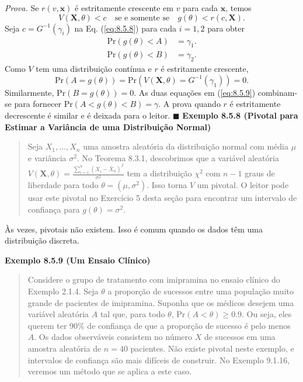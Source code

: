 \noindent\textit{Prova.} Se $r(v, \mathbf{x})$ é estritamente crescente em $v$ para cada $\mathbf{x}$, temos
\begin{equation} \label{eq:8.5.8}
V(\mathbf{X}, \theta) < c \quad \text{se e somente se} \quad g(\theta) < r(c, \mathbf{X}).
\end{equation}
Seja $c = G^{-1}(\gamma_i)$ na Eq. (\ref{eq:8.5.8}) para cada $i=1, 2$ para obter
\begin{align} 
    \text{Pr}(g(\theta) < A) &= \gamma_1. \nonumber \\
    \text{Pr}(g(\theta) < B) &= \gamma_2. \label{eq:8.5.9}
\end{align}
Como $V$ tem uma distribuição contínua e $r$ é estritamente crescente,
$$
\text{Pr}(A = g(\theta)) = \text{Pr}(V(\mathbf{X}, \theta) = G^{-1}(\gamma_1)) = 0.
$$
Similarmente, $\text{Pr}(B = g(\theta)) = 0$. As duas equações em (\ref{eq:8.5.9}) combinam-se para fornecer $\text{Pr}(A < g(\theta) < B) = \gamma$. A prova quando $r$ é estritamente decrescente é similar e é deixada para o leitor. \hfill $\blacksquare$
\vspace{1em}
\noindent\textbf{Exemplo 8.5.8 (Pivotal para Estimar a Variância de uma Distribuição Normal)}
\begin{quote}
    Seja $X_1, \dots, X_n$ uma amostra aleatória da distribuição normal com média $\mu$ e variância $\sigma^2$. No Teorema 8.3.1, descobrimos que a variável aleatória $V(\mathbf{X}, \theta) = \frac{\sum_{i=1}^n(X_i - \bar{X}_n)^2}{\sigma^2}$ tem a distribuição $\chi^2$ com $n-1$ graus de liberdade para todo $\theta = (\mu, \sigma^2)$. Isso torna $V$ um pivotal. O leitor pode usar este pivotal no Exercício 5 desta seção para encontrar um intervalo de confiança para $g(\theta) = \sigma^2$.
\end{quote}
\vspace{1em}

Às vezes, pivotais não existem. Isso é comum quando os dados têm uma distribuição discreta.

\vspace{1em}
\noindent\textbf{Exemplo 8.5.9 (Um Ensaio Clínico)}
\begin{quote}
    Considere o grupo de tratamento com imipramina no ensaio clínico do Exemplo 2.1.4. Seja $\theta$ a proporção de sucessos entre uma população muito grande de pacientes de imipramina. Suponha que os médicos desejem uma variável aleatória $A$ tal que, para todo $\theta$, $\text{Pr}(A < \theta) \ge 0.9$. Ou seja, eles querem ter 90\% de confiança de que a proporção de sucesso é pelo menos $A$. Os dados observáveis consistem no número $X$ de sucessos em uma amostra aleatória de $n=40$ pacientes. Não existe pivotal neste exemplo, e intervalos de confiança são mais difíceis de construir. No Exemplo 9.1.16, veremos um método que se aplica a este caso.
\end{quote}
\vspace{1em}

